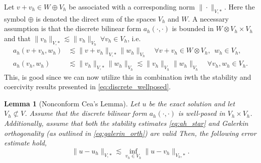 \documentclass[11pt]{article}
\newtheorem{lemma}[theorem]{Lemma}
\theoremstyle{remark}
\numberwithin{equation}{section}
\begin{document}
Let $v + v_{h} \in W \oplus V_{h} $ be associated with a corresponding norm $\| \cdot  \|_{V,*  }^{  } $. Here the symbol $\oplus$ is denoted the direct sum of the spaces $V_{h}$ and $W$.
A necessary assumption is that the discrete bilinear form $a_{h}( \cdot ,\cdot ) $  is bounded in $W \otimes V_{h} \times V_{h}$ and that $\| v_{h} \|_{V,*  }^{  } \lesssim  \| v_{h} \|_{ V_{h} }^{  }  \ \forall v_{h } \in  V_{h} $, i.e.
\begin{equation}
    \label{eq:ah_star}
    \begin{split}
a_{h}( v + v_{h}, w_{h}) & \lesssim  \| v + v_{h} \|_{ V,* }^{  } \| w_{h} \|_{V_{h}  }^{  } \quad  \forall v+ v_{h} \in W \otimes V_{h}, \ \  w_{h} \in V_{h}, \\
a_{h}( v_{h}, w_{h}) & \lesssim  \|  v_{h} \|_{ V,* }^{  } \| w_{h} \|_{V_{h}  }^{  } \lesssim \|  v_{h} \|_{ V_{h} }^{  } \| w_{h} \|_{V_{h}  }^{  } \quad  \forall  v_{h},  w_{h} \in V_{h}.
    \end{split}
\end{equation}
This, is good since we can now utilize this in combination iwth the stability and coercivity results presented in \eqref{eq:discrete_wellposed}.


\begin{lemma}[Nonconform Cea's Lemma]
    Let $u$ be the exact solution and let $V_{h} \not \subset V$.
    Assume that the discrete bilinear form $a_{h}( \cdot ,\cdot ) $ is well-posed in $V_{h} \times V_{h}$. Additionally, assume that both the stability estimates \eqref{eq:ah_star} and Galerkin orthogonality (as outlined in \eqref{eq:galerin_orth}) are valid
    Then, the following error estimate hold,
    \begin{equation}
        \| u - u_{h} \|_{ V,*  }^{  }  \lesssim  \inf_{v_{h} \in  V_{h}}  \| u - v_{h} \|_{ V_{h},*  }^{  }.
    \end{equation}
\end{lemma}
\end{document}
